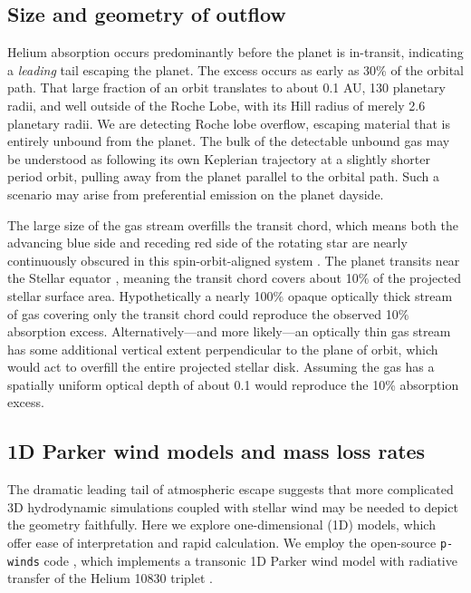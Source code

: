 \documentclass[twocolumn]{aastex631}
\begin{document}
\subsection{Size and geometry of outflow}
Helium absorption occurs predominantly before the planet is in-transit, indicating a \emph{leading} tail escaping the planet.  The excess occurs as early as 30\% of the orbital path.  That large fraction of an orbit translates to about 0.1 AU, 130 planetary radii, and well outside of the Roche Lobe, with its Hill radius of merely 2.6 planetary radii.  We are detecting Roche lobe overflow, escaping material that is entirely unbound from the planet.  The bulk of the detectable unbound gas may be understood as following its own Keplerian trajectory at a slightly shorter period orbit, pulling away from the planet parallel to the orbital path.  Such a scenario may arise from preferential emission on the planet dayside.

The large size of the gas stream overfills the transit chord, which means both the advancing blue side and receding red side of the rotating star are nearly continuously obscured in this spin-orbit-aligned system \citep{2017AJ....153..211Z}. The planet transits near the Stellar equator \citep{2017AJ....153..211Z}, meaning the transit chord covers about 10$\%$ of the projected stellar surface area.  Hypothetically a nearly 100$\%$ opaque optically thick stream of gas covering only the transit chord could reproduce the observed 10$\%$ absorption excess.  Alternatively---and more likely---an optically thin gas stream has some additional vertical extent perpendicular to the plane of orbit, which would act to overfill the entire projected stellar disk.  Assuming the gas has a spatially uniform optical depth of about 0.1 would reproduce the 10\% absorption excess.


\subsection{1D Parker wind models and mass loss rates}\label{pwinds}
The dramatic leading tail of atmospheric escape suggests that more complicated 3D hydrodynamic simulations coupled with stellar wind \citep{2022ApJ...926..226M} may be needed to depict the geometry faithfully.  Here we explore one-dimensional (1D) models, which offer ease of interpretation and rapid calculation.  We employ the open-source \texttt{p-winds} code \citep{2022A&A...659A..62D}, which implements a transonic 1D Parker wind model with radiative transfer of the Helium 10830 triplet \citep{2018ApJ...855L..11O,2020A&A...636A..13L}.
\end{document}
